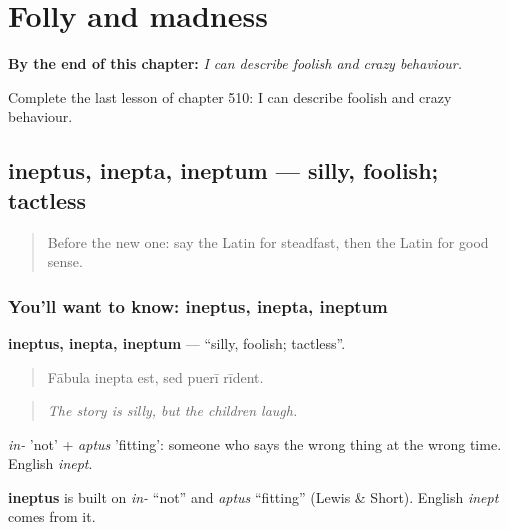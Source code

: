 
\chapter{Folly and madness}
\label{ch:la-folly-and-madness}

\begin{chapteropening}
\textbf{By the end of this chapter:} \emph{I can describe foolish and crazy behaviour.}

Complete the last lesson of chapter 510: I can describe foolish and crazy behaviour.
\end{chapteropening}

\section[ineptus, inepta, ineptum]{ineptus, inepta, ineptum — silly, foolish; tactless}

\label{lesson:LA-C510-ineptus}



\begin{quote}
Before the new one: say the Latin for steadfast, then the Latin for good sense.
\end{quote}

\subsection*{You'll want to know: ineptus, inepta, ineptum}
\textbf{ineptus, inepta, ineptum} — \textquotedblleft{}silly, foolish; tactless\textquotedblright{}.

\begin{quote}
Fābula inepta est, sed puerī rīdent.
\end{quote}

\begin{quote}
\emph{The story is silly, but the children laugh.}
\end{quote}

\emph{in-} 'not' + \emph{aptus} 'fitting': someone who says the wrong thing at the wrong time. English \emph{inept}.

\begin{cousinweb}
\textbf{ineptus} is built on \emph{in-} \textquotedblleft{}not\textquotedblright{} and \emph{aptus} \textquotedblleft{}fitting\textquotedblright{} (Lewis \& Short). English \emph{inept} comes from it.
\end{cousinweb}

